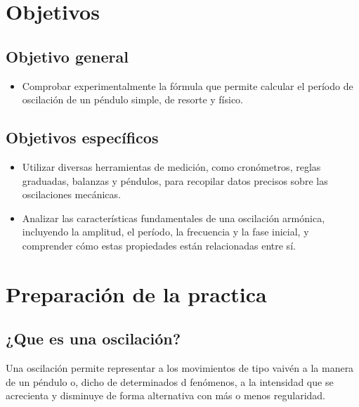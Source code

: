\documentclass[twocolumn, 12pt]{article}
\begin{document}
\section{Objetivos}

\subsection{Objetivo general}

\begin{itemize}[label=$\triangleright$]
    \item Comprobar experimentalmente la fórmula que permite calcular
          el período de oscilación de un péndulo simple, de resorte y
          físico.
\end{itemize}

\subsection{Objetivos específicos}

\begin{itemize}[label=$\triangleright$]
    \item Utilizar diversas herramientas de medición, como
          cronómetros, reglas graduadas, balanzas y péndulos, para
          recopilar datos precisos sobre las oscilaciones mecánicas.

    \item Analizar las características fundamentales de una
          oscilación armónica, incluyendo la amplitud, el período, la
          frecuencia y la fase inicial, y comprender cómo estas
          propiedades están relacionadas entre sí.
\end{itemize}

\section{Preparación de la practica}

\subsection{¿Que es una oscilación?}

Una oscilación permite representar a los movimientos de
tipo vaivén a la manera de un péndulo o, dicho de
determinados d fenómenos, a la intensidad que se acrecienta
y disminuye de forma alternativa con más o menos
regularidad.
\end{document}

